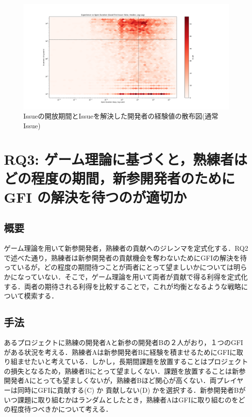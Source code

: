 \documentclass[11pt]{jreport}
\newcommand{\RQThree}{ゲーム理論に基づくと，熟練者はどの程度の期間，新参開発者のために GFI の解決を待つのが適切か}
\begin{document}
\begin{figure}[H]
\centerline{\includegraphics[width=0.9\linewidth]{@BSthesis2024_Nakai/BSthesis2024_Nakai_fig/fhex_red.png}}
\caption{Issueの開放期間とIssueを解決した開発者の経験値の散布図(通常Issue)}
\label{fig:milestone}
\end{figure}

\section{RQ3: \RQThree}

\subsection{概要}

ゲーム理論を用いて新参開発者，熟練者の貢献へのジレンマを定式化する．RQ2で述べた通り，熟練者は新参開発者の貢献機会を奪わないためにGFIの解決を待っているが，どの程度の期間待つことが両者にとって望ましいかについては明らかになっていない．そこで，ゲーム理論を用いて両者が貢献で得る利得を定式化する．両者の期待される利得を比較することで，これが均衡となるような戦略について模索する．

\subsection{手法}
あるプロジェクトに熟練の開発者Aと新参の開発者Bの２人がおり，１つのGFIがある状況を考える．熟練者Aは新参開発者Bに経験を積ませるためにGFIに取り組ませたいと考えている．しかし，長期間課題を放置することはプロジェクトの損失となるため，熟練者Bにとって望ましくない．課題を放置することは新参開発者Aにとっても望ましくないが，熟練者Bほど関心が高くない．両プレイヤーは同時にGFIに貢献する(C) か 貢献しない(D) かを選択する．新参開発者Bがいつ課題に取り組むかはランダムとしたとき，熟練者AはGFIに取り組むのをどの程度待つべきかについて考える．
\end{document}
